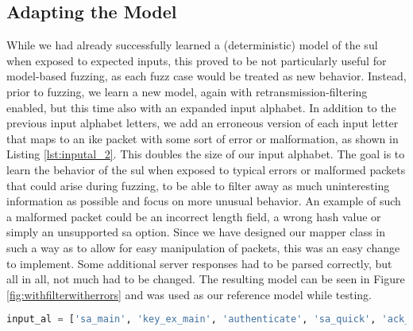 \subsection{Adapting the Model} \label{subsec:adapting_model}
While we had already successfully learned a (deterministic) model of the \ac{sul} when exposed to expected inputs, this proved to be not particularly useful for model-based fuzzing, as each fuzz case would be treated as new behavior. Instead, prior to fuzzing, we learn a new model, again with retransmission-filtering enabled, but this time also with an expanded input alphabet. In addition to the previous input alphabet letters, we add an erroneous version of each input letter that maps to an \ac{ike} packet with some sort of error or malformation, as shown in Listing \ref{lst:inputal_2}. This doubles the size of our input alphabet. The goal is to learn the behavior of the \ac{sul} when exposed to typical errors or malformed packets that could arise during fuzzing, to be able to filter away as much uninteresting information as possible and focus on more unusual behavior. An example of such a malformed packet could be an incorrect length field, a wrong hash value or simply an unsupported \ac{sa} option. Since we have designed our mapper class in such a way as to allow for easy manipulation of packets, this was an easy change to implement. Some additional server responses had to be parsed correctly, but all in all, not much had to be changed. The resulting model can be seen in Figure \ref{fig:withfilterwitherrors} and was used as our reference model while testing.  

\begin{lstlisting}[float=h, caption=The Updated Input Alphabet, label=lst:inputal_2, numbers=none, language=python]
	input_al = ['sa_main', 'key_ex_main', 'authenticate', 'sa_quick', 'ack_quick', 'sa_main_err', 'key_ex_main_err', 'authenticate_err', 'sa_quick_err', 'ack_quick_err']
\end{lstlisting}


